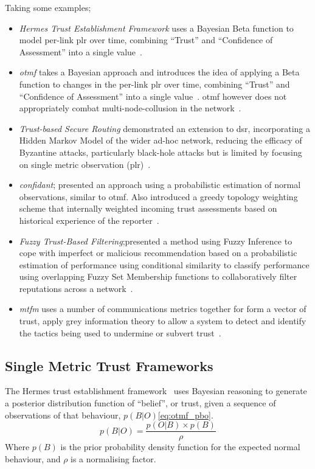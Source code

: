 Taking some examples; %
%
\begin{itemize}
  \item \emph{Hermes Trust Establishment Framework} uses a Bayesian Beta function to model per-link \gls{plr} over time, combining ``Trust'' and ``Confidence of Assessment'' into a single value~\cite{Zouridaki2005}.
  \item \emph{\acrfull{otmf}} takes a Bayesian approach and introduces the idea of applying a Beta function to changes in the per-link \gls{plr} over time, combining ``Trust'' and ``Confidence of Assessment'' into a single value~\cite{Li2008}.
    \gls{otmf} however does not appropriately combat multi-node-collusion in the network~\cite{Cho2011}.
  \item \emph{Trust-based Secure Routing} demonstrated an extension to \gls{dsr}, incorporating a Hidden Markov Model of the wider ad-hoc network, reducing the efficacy of Byzantine attacks, particularly black-hole attacks but is limited by focusing on single metric observation (\gls{plr})~\cite{Moe2008a,Cho2011}.
  \item \emph{\gls{confidant}}; presented an approach using a probabilistic estimation of normal observations, similar to \gls{otmf}.
    Also introduced a greedy topology weighting scheme that internally weighted incoming trust assessments based on historical experience of the reporter~\cite{Buchegger2002}.
  \item \emph{Fuzzy Trust-Based Filtering};presented a method using Fuzzy Inference to cope with imperfect or malicious recommendation based on a probabilistic estimation of performance using conditional similarity to classify performance using overlapping Fuzzy Set Membership functions to collaboratively filter reputations across a network~\cite{Luo2008}.
  \item \emph{\acrfull{mtfm}} uses a number of communications metrics together for form a vector of trust, apply grey information theory to allow a system to detect and identify the tactics being used to undermine or subvert trust~\cite{Guo11}.
\end{itemize}
%

\subsection{Single Metric Trust Frameworks}

The Hermes trust establishment framework~\cite{Zouridaki2005} uses Bayesian reasoning to generate a posterior distribution function of ``belief'', or trust, given a sequence of observations of that behaviour, $p(B|O)$\eqref{eq:otmf_pbo}.
%
\begin{equation}
  p(B|O)  = \frac{p(O|B) \times p(B)}{\rho}
  \label{eq:otmf_pbo}
\end{equation}
%
Where $p(B)$ is the prior probability density function for the expected normal behaviour, and $\rho$ is a normalising factor.

